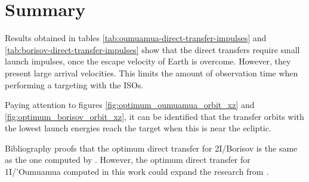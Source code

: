 \section{Summary}
\label{sec:direct-results}

Results obtained in tables \ref{tab:oumuamua-direct-transfer-impulses} and
\ref{tab:borisov-direct-transfer-impulses} show that the direct transfers
require small launch impulses, once the escape velocity of Earth is overcome.
However, they present large arrival velocities. This limits the amount of
observation time when performing a targeting with the ISOs.

Paying attention to figures \ref{fig:optimum_oumuamua_orbit_xz} and
\ref{fig:optimum_borisov_orbit_xz}, it can be identified that the transfer
orbits with the lowest launch energies reach the target when this is near the
ecliptic.

Bibliography proofs that the optimum direct transfer for 2I/Borisov is the same as
the one computed by \cite{hibberd2021}. However, the optimum direct transfer for
1I/'Oumuamua computed in this work could expand the research from \cite{hein2018}.
